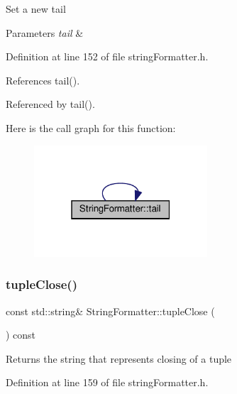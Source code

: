 Set a new tail 
\begin{DoxyParams}{Parameters}
{\em tail} & \\
\hline
\end{DoxyParams}


Definition at line 152 of file string\+Formatter.\+h.



References tail().



Referenced by tail().

Here is the call graph for this function\+:
\nopagebreak
\begin{figure}[H]
\begin{center}
\leavevmode
\includegraphics[width=183pt]{classStringFormatter_ad7a18b6b3c5d10addf6055dd910695c2_cgraph}
\end{center}
\end{figure}
\mbox{\label{classStringFormatter_a35e3c3ce024ea3934bad1e26e85a5ae0}} 
\subsubsection{\texorpdfstring{tuple\+Close()}{tupleClose()}\hspace{0.1cm}{\footnotesize\ttfamily [1/2]}}
{\footnotesize\ttfamily const std\+::string\& String\+Formatter\+::tuple\+Close (\begin{DoxyParamCaption}{ }\end{DoxyParamCaption}) const\hspace{0.3cm}{\ttfamily [inline]}}

\begin{DoxyReturn}{Returns}
the string that represents closing of a tuple 
\end{DoxyReturn}


Definition at line 159 of file string\+Formatter.\+h.



